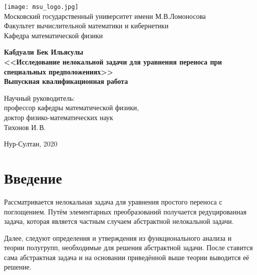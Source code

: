 \documentclass{article}
\theoremstyle{definition}
\begin{document}
	\begin{titlepage}
		\begin{center}
			\texttt{[image: msu\_logo.jpg]}
			\small
			~\\[0.1cm]
			Московский государственный университет имени М.В.Ломоносова
			~\\[0.1cm]
			Факультет вычислительной математики и кибернетики
			~\\[0.1cm]
			Кафедра математической физики
			~\\[1.0cm]
			\normalsize
		\end{center}
	
  	\vspace{1.5cm}
\begin{center}
	\textbf{\large{Кабдуали Бек Ильясулы}}
	\\[2cm]
	\textbf{\large {<<Исследование нелокальной задачи для уравнения переноса при специальных предположениях>>}}
	\\[1.5cm]
	
	\textbf{\large Выпускная квалификационная работа}
	\\[1cm]
	\begin{normalsize}
		\begin{flushright}
			\small
			Научный руководитель:
			\\
			профессор кафедры математической физики,\\ доктор физико-математических наук
			\\
			Тихонов И.\,В.
		\end{flushright}
		\normalsize
	\end{normalsize}
	\vfill 
	
	\small{Нур-Султан, 2020}
\end{center} 

	\end{titlepage}

\newpage

\tableofcontents

\newpage

\section*{Введение}
Рассматривается нелокальная задача для уравнения простого переноса с поглощением. 
Путём элементарных преобразований получается редуцированная задача,
которая является частным случаем абстрактной нелокальной задачи. 

Далее, следуют определения и утверждения из функционального анализа и теории полугрупп, необходимые для решения абстрактной задачи. После ставится сама абстрактная задача и на основании приведённой выше теории выводится её решение.
\end{document}
